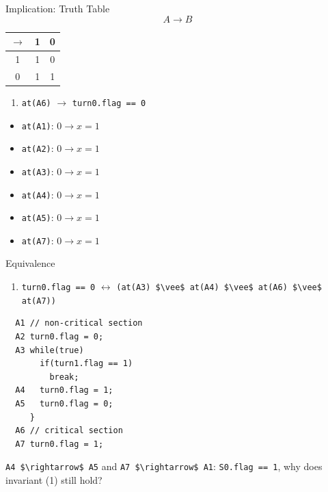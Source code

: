 \begin{frame}{Implication: Truth Table}
  $$A \rightarrow B$$


  \begin{center}
    \begin{tabular}{|c|c c|}
      \hline
      $\rightarrow$ & 1 & 0 \\\hline
      1 & 1 & 0 \\
      0 & 1 & 1 \\\hline
    \end{tabular}
  \end{center}


  \begin{enumerate}
  \item \lstinline!at(A6)! $\rightarrow$ \lstinline!turn0.flag == 0!
  \end{enumerate}


  \begin{itemize}
  \item \lstinline!at(A1)!: $0 \rightarrow x = 1$
  \item \lstinline!at(A2)!: $0 \rightarrow x = 1$
  \item \lstinline!at(A3)!: $0 \rightarrow x = 1$
  \item \lstinline!at(A4)!: $0 \rightarrow x = 1$
  \item \lstinline!at(A5)!: $0 \rightarrow x = 1$
  \item \lstinline!at(A7)!: $0 \rightarrow x = 1$
  \end{itemize}
\end{frame}

\begin{frame}[fragile]{Equivalence}
  \begin{enumerate}
  \item \lstinline!turn0.flag == 0! $\leftrightarrow$ 
    \lstinline!(at(A3) $\vee$ at(A4) $\vee$ at(A6) $\vee$ at(A7))!
  \end{enumerate}


\begin{lstlisting}
  A1 // non-critical section
  A2 turn0.flag = 0;
  A3 while(true)
       if(turn1.flag == 1) 
         break;
  A4   turn0.flag = 1;
  A5   turn0.flag = 0;
     }
  A6 // critical section
  A7 turn0.flag = 1;
\end{lstlisting}


  \lstinline!A4 $\rightarrow$ A5! and \lstinline!A7 $\rightarrow$ A1!:
  \lstinline!S0.flag == 1!, why does invariant (1) still hold?
\end{frame}

